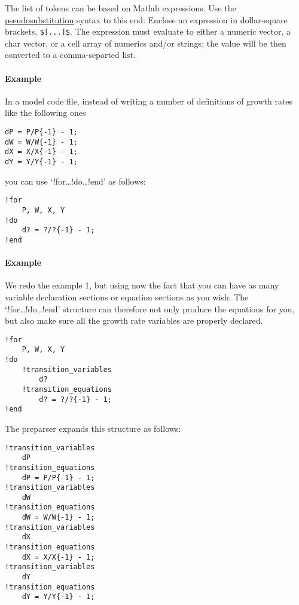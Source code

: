 The list of tokens can be based on Matlab expressions. Use the
\href{modellang/pseudosubs}{pseudosubstitution} syntax to this end:
Enclose an expression in dollar-square brackets, \texttt{\${[}...{]}\$}.
The expression must evaluate to either a numeric vector, a char vector,
or a cell array of numerics and/or strings; the value will be then
converted to a comma-separted list.

\paragraph{Example}

In a model code file, instead of writing a number of definitions of
growth rates like the following ones

\begin{verbatim}
dP = P/P{-1} - 1;
dW = W/W{-1} - 1;
dX = X/X{-1} - 1;
dY = Y/Y{-1} - 1;
\end{verbatim}

you can use `!for\ldots{}!do\ldots{}!end' as follows:

\begin{verbatim}
!for
    P, W, X, Y
!do
    d? = ?/?{-1} - 1;
!end
\end{verbatim}

\paragraph{Example}

We redo the example 1, but using now the fact that you can have as many
variable declaration sections or equation sections as you wish. The
`!for\ldots{}!do\ldots{}!end' structure can therefore not only produce
the equations for you, but also make sure all the growth rate variables
are properly declared.

\begin{verbatim}
!for
    P, W, X, Y
!do
    !transition_variables
        d?
    !transition_equations
        d? = ?/?{-1} - 1;
!end
\end{verbatim}

The preparser expands this structure as follows:

\begin{verbatim}
!transition_variables
    dP
!transition_equations
    dP = P/P{-1} - 1;
!transition_variables
    dW
!transition_equations
    dW = W/W{-1} - 1;
!transition_variables
    dX
!transition_equations
    dX = X/X{-1} - 1;
!transition_variables
    dY
!transition_equations
    dY = Y/Y{-1} - 1;
\end{verbatim}

